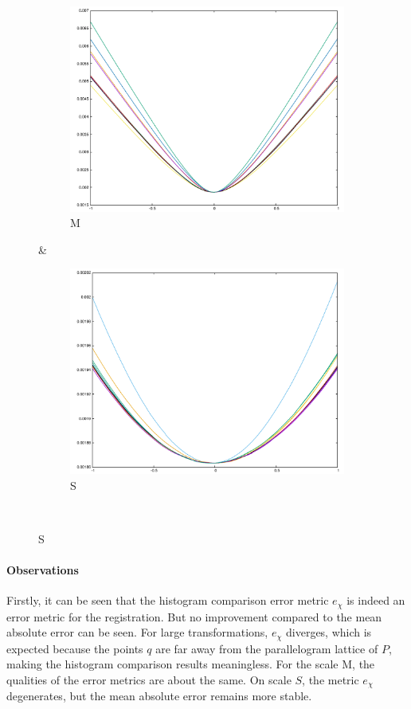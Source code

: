 \begin{figure}[H]
\begin{subfigure}{.33\textwidth}
	\includegraphics[width=\linewidth]{fig/ajherr/t/M_mae.pdf}
	\caption{M}
\end{subfigure}&
\begin{subfigure}{.33\textwidth}
	\includegraphics[width=\linewidth]{fig/ajherr/t/S_mae.pdf}
	\caption{S}
\end{subfigure}\\
\end{figure}

\paragraph{Observations} Firstly, it can be seen that the histogram comparison error metric $e_{\chi}$ is indeed an error metric for the registration. But no improvement compared to the mean absolute error can be seen. For large transformations, $e_{\chi}$ diverges, which is expected because the points $q$ are far away from the parallelogram lattice of $P$, making the histogram comparison results meaningless. For the scale M, the qualities of the error metrics are about the same. On scale $S$, the metric $e_{\chi}$ degenerates, but the mean absolute error remains more stable.


